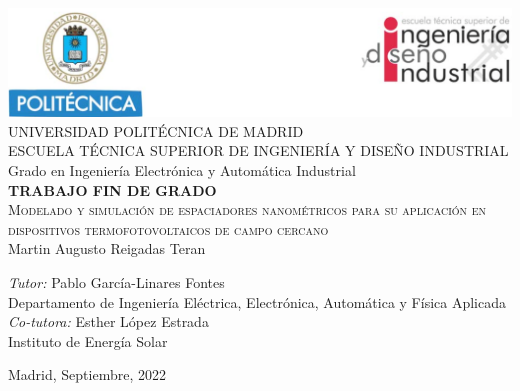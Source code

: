 \begin{titlepage}
\begin{center}
\includegraphics[width=1\textwidth]{figuras/cabecera.png}  \\[0.7 cm]

\LARGE UNIVERSIDAD POLITÉCNICA DE MADRID \\ [1 cm]

\LARGE ESCUELA TÉCNICA SUPERIOR DE INGENIERÍA Y DISEÑO INDUSTRIAL \\ [1 cm]

\LARGE Grado en Ingeniería Electrónica y Automática Industrial\\ [.7 cm]

\LARGE \textbf{TRABAJO FIN DE GRADO}\\[0.7 cm]

\Huge \textsc{Modelado y simulación de espaciadores nanométricos para su aplicación en dispositivos termofotovoltaicos de campo cercano}\\[1 cm]

\LARGE Martin Augusto Reigadas Teran \\[0.7 cm]
\begin{flushleft}
\Large
\emph{Tutor:} {Pablo García-Linares Fontes}\\
{ Departamento de Ingeniería Eléctrica, Electrónica, Automática y Física Aplicada}\\[.2cm]
\emph{Co-tutora:} Esther López Estrada\\
{ Instituto de Energía Solar}\\
\end{flushleft}

\vfill

{\large Madrid, Septiembre, 2022}
\cleardoublepage 
\end{center}
\end{titlepage}
